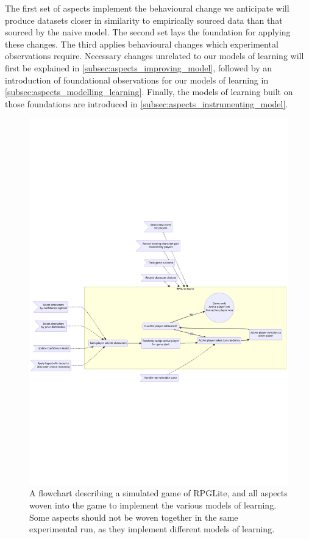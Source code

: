 The first set of aspects implement the behavioural change we anticipate will
produce datasets closer in similarity to empirically sourced data than that
sourced by the naive model. The second set lays the foundation for applying
these changes. The third applies behavioural changes which experimental
observations require. Necessary changes unrelated to our models of learning will
first be explained in \cref{subsec:aspects_improving_model}, followed by an
introduction of foundational observations for our models of learning in
\cref{subsec:aspects_modelling_learning}. Finally, the models of learning built
on those foundations are introduced in
\cref{subsec:aspects_instrumenting_model}.

\begin{figure}
  \centering
  \includegraphics[width=\columnwidth]{60_optimisation_with_aspects/diagrams/aspect_applied_model.png}
  \caption{A flowchart describing a simulated game of RPGLite, and all aspects woven into the game to implement the various models of learning. Some aspects should not be woven together in the same experimental run, as they implement different models of learning.}
  \label{fig:all_aspects_applied}
\end{figure}

